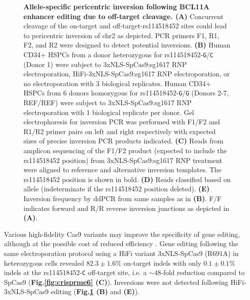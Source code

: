 \documentclass[a4paper, titlepage, openright]{book}
\begin{document}
\begin{figure}
	\caption[Allele-specific pericentric inversion following BCL11A enhancer editing due to off-target cleavage]{\textbf{Allele-specific pericentric inversion following BCL11A enhancer editing due to off-target cleavage. (A)} Concurrent cleavage of the on-target and off-target-rs114518452 sites could lead to pericentric inversion of chr2 as depicted. PCR primers F1, R1, F2, and R2 were designed to detect potential inversions. \textbf{(B)} Human CD34+ HSPCs from a donor heterozygous for rs114518452-\texttt{G}/\texttt{C} (Donor 1) were subject to 3xNLS-SpCas9:sg1617 RNP electroporation, HiFi-3xNLS-SpCas9:sg1617 RNP electroporation, or no electroporation with 3 biological replicates. Human CD34+ HSPCs from 6 donors homozygous for rs114518452-\texttt{G}/\texttt{G} (Donors 2-7, REF/REF) were subject to 3xNLS-SpCas9:sg1617 RNP electroporation with 1 biological replicate per donor. Gel electrophoresis for inversion PCR was performed with F1/F2 and R1/R2 primer pairs on left and right respectively with expected sizes of precise inversion PCR products indicated. \textbf{(C)} Reads from amplicon sequencing of the F1/F2 product (expected to include the rs114518452 position) from 3xNLS-SpCas9:sg1617 RNP treatment were aligned to reference and alternative inversion templates. The rs114518452 position is shown in bold. \textbf{(D)} Reads classified based on allele (indeterminate if the rs114518452 position deleted). \textbf{(E)} Inversion frequency by ddPCR from same samples as in \textbf{(B)}. F/F indicates forward and R/R reverse inversion junctions as depicted in \textbf{(A)}.}
	\label{fig:crisprme7}
\end{figure} 
Various high-fidelity Cas9 variants may improve the specificity of gene editing, although at the possible cost of reduced efficiency \citep{schmid2020highly}. Gene editing following the same electroporation protocol using a HiFi variant 3xNLS-SpCas9 (R691A) \citep{vakulskas2018high} in heterozygous cells revealed $82.3 \pm 1.6\%$ on-target indels with only $0.1 \pm 0.1\%$ indels at the rs114518452-\texttt{C} off-target site, i.e. a $\sim 48$-fold reduction compared to SpCas9 (\textbf{Fig.\ref{fig:crisprme6} (C)}). Inversions were not detected following HiFi-3xNLS-SpCas9 editing (\textbf{Fig.\ref{fig:crisprme7} (B)} and \textbf{(E)}). 
\end{document}
